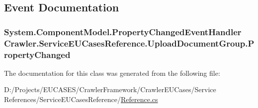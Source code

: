 \subsection{Event Documentation}
\hypertarget{class_crawler_1_1_service_e_u_cases_reference_1_1_upload_document_group_a14d6f04fd8d1e2514fbc8edb4a3fdd1d}{
\subsubsection[{Property\-Changed}]{\setlength{\rightskip}{0pt plus 5cm}System.\-Component\-Model.\-Property\-Changed\-Event\-Handler Crawler.\-Service\-E\-U\-Cases\-Reference.\-Upload\-Document\-Group.\-Property\-Changed}}\label{class_crawler_1_1_service_e_u_cases_reference_1_1_upload_document_group_a14d6f04fd8d1e2514fbc8edb4a3fdd1d}


The documentation for this class was generated from the following file\-:\begin{DoxyCompactItemize}
\item 
D\-:/\-Projects/\-E\-U\-C\-A\-S\-E\-S/\-Crawler\-Framework/\-Crawler\-E\-U\-Cases/\-Service References/\-Service\-E\-U\-Cases\-Reference/\hyperlink{_reference_8cs}{Reference.\-cs}\end{DoxyCompactItemize}
